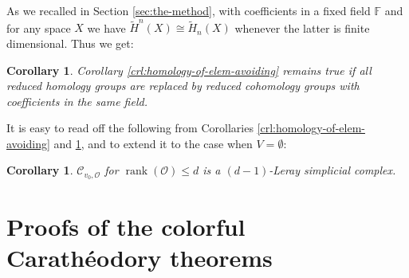 \documentclass[a4paper,11pt,reqno, english]{amsart}
\newtheorem{corollary}[theorem]{Corollary}
\theoremstyle{definition}
\theoremstyle{remark}
\begin{document}
As we recalled in Section \ref{sec:the-method}, with coefficients in a fixed field $\mathbb{F}$ and for any space $X$ we have $\tilde{H}^n(X)\cong\tilde{H}_n(X)$ whenever the latter is finite dimensional. Thus we get:
\begin{corollary}\label{crl:cohomology-of-elem-avoiding}
    Corollary \ref{crl:homology-of-elem-avoiding} remains true if all reduced homology groups are replaced by reduced cohomology groups with coefficients in the same field.
\end{corollary}
It is easy to read off the following from Corollaries \ref{crl:homology-of-elem-avoiding} and \ref{crl:cohomology-of-elem-avoiding}, and to extend it to the case when $V=\emptyset$:
\begin{corollary}\label{crl:element-avoiding-leray}
    $\mathscr{C}_{v_0,\mathscr{O}}$ for $\operatorname{rank}(\mathscr{O})\leq d$ is a $(d-1)$-Leray simplicial complex.
\end{corollary}


\bigskip
\section{Proofs of the colorful Carath\'eodory theorems}\label{sec:cc-proofs}
\bigskip
\end{document}

